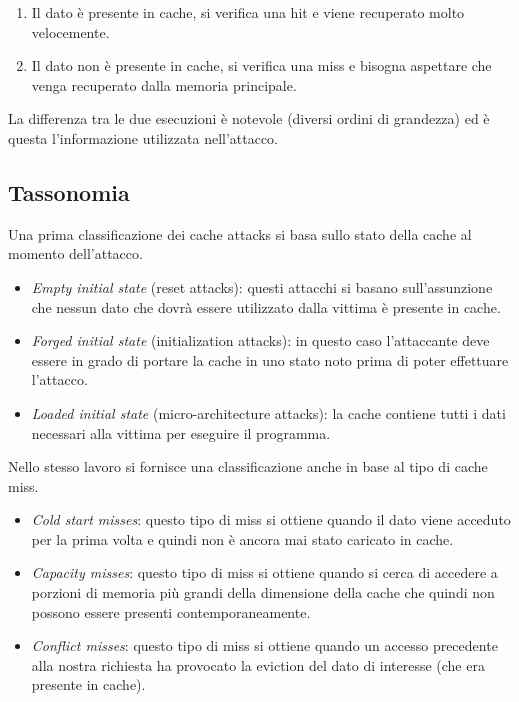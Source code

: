 		\begin{enumerate}
			\item Il dato è presente in cache, si verifica una hit e viene recuperato molto velocemente.
			\item Il dato non è presente in cache, si verifica una miss e bisogna aspettare che venga recuperato dalla memoria principale.
		\end{enumerate}
		
		La differenza tra le due esecuzioni è notevole (diversi ordini di grandezza) ed è questa l'informazione utilizzata nell'attacco.
		
		\subsection{Tassonomia}
			Una prima classificazione dei cache attacks si basa sullo stato della cache al momento dell'attacco\cite{canteaut2006understanding}.
			
			\begin{itemize}
				\item \emph{Empty initial state} (reset attacks): questi attacchi si basano sull'assunzione che nessun dato che dovrà essere utilizzato dalla vittima è presente in cache.
				\item \emph{Forged initial state} (initialization attacks): in questo caso l'attaccante deve essere in grado di portare la cache in uno stato noto prima di poter effettuare l'attacco.
				\item \emph{Loaded initial state} (micro-architecture attacks): la cache contiene tutti i dati necessari alla vittima per eseguire il programma.
			\end{itemize}
		
			Nello stesso lavoro si fornisce una classificazione anche in base al tipo di cache miss. 
			
			\begin{itemize}
				\item \emph{Cold start misses}: questo tipo di miss si ottiene quando il dato viene acceduto per la prima volta e quindi non è ancora mai stato caricato in cache.
				\item \emph{Capacity misses}: questo tipo di miss si ottiene quando si cerca di accedere a porzioni di memoria più grandi della dimensione della cache che quindi non possono essere presenti contemporaneamente.
				\item \emph{Conflict misses}: questo tipo di miss si ottiene quando un accesso precedente alla nostra richiesta ha provocato la eviction del dato di interesse (che era presente in cache).
			\end{itemize}
			
